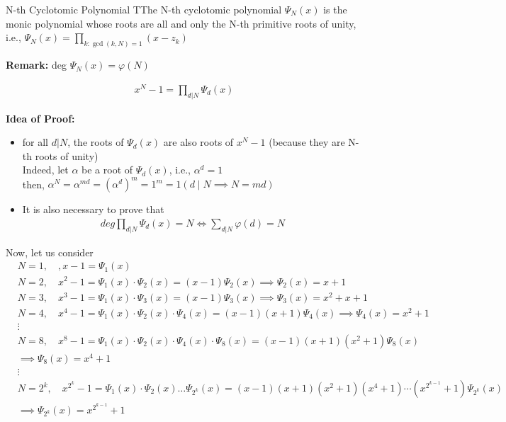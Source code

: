 \begin{defBox}{N-th Cyclotomic Polynomial}
    TThe N-th cyclotomic polynomial $\Psi_N(x)$ is the monic polynomial whose roots are all and only the N-th primitive roots of unity, i.e., $\Psi_N(x) = \prod_{k: \gcd(k, N) = 1} (x - z_k)$
\end{defBox}
\noindent
\textbf{Remark:} deg $\Psi_N(x) = \varphi(N)$
\vspace{0.5 cm}

\begin{propBox}{}{}
    \begin{align*}
        x^N - 1 = \prod_{d | N} \Psi_d(x)
    \end{align*}    
\end{propBox}

\noindent
\textbf{Idea of Proof:}
\begin{itemize}
    \item for all $d | N$, the roots of $\Psi_d(x)$ are also roots of $x^N - 1$ (because they are N-th roots of unity)\\
    Indeed, let $\alpha$ be a root of $\Psi_d(x)$, i.e., $\alpha^d = 1$ 
    \\
    then, $\alpha^N = \alpha^{md} = (\alpha^d)^m = 1^m = 1 (d \mid N \implies N = md)$
    \item It is also necessary to prove that
    \begin{align*}
        deg \prod_{d | N} \Psi_d(x) = N \iff \sum_{d | N} \varphi(d) = N
    \end{align*}
\end{itemize}

\noindent
Now, let us consider
\begin{align*}
    &N= 1, \quad, x-1 = \Psi_1(x)\\
    &N = 2, \quad x^2 - 1 = \Psi_1(x) \cdot \Psi_2(x) = (x-1)\Psi_2(x) \implies \boxed{\Psi_2(x) = x + 1}\\
    &N = 3, \quad x^3 - 1 = \Psi_1(x) \cdot \Psi_3(x) = (x-1)\Psi_3(x) \implies \boxed{\Psi_3(x) = x^2 + x + 1}\\
    &N = 4, \quad x^4 - 1 = \Psi_1(x) \cdot \Psi_2(x) \cdot \Psi_4(x) = (x-1)(x+1)\Psi_4(x) \implies \boxed{\Psi_4(x) = x^2+1}\\
    &\vdots\\
    &N = 8, \quad x^8 - 1 = \Psi_1(x) \cdot \Psi_2(x) \cdot \Psi_4(x) \cdot \Psi_8(x) = (x-1)(x+1)(x^2+1)\Psi_8(x)\\ 
    &\implies \boxed{\Psi_8(x) = x^4 + 1}\\
    &\vdots\\
    &N = 2^k, \quad x^{2^k} - 1 = \Psi_1(x) \cdot \Psi_2(x) \ldots \Psi_{2^k}(x) = (x-1)(x+1)(x^2+1)(x^4+1) \cdots (x^{2^{k-1}} + 1)\Psi_{2^k}(x)\\
    &\implies \boxed{\Psi_{2^k}(x) = x^{2^{k-1}} + 1}
\end{align*}

